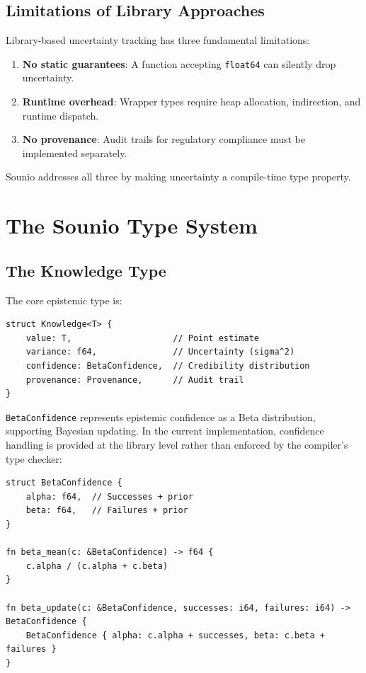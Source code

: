 \documentclass[11pt,a4paper]{article}
\begin{document}
\subsection{Limitations of Library Approaches}

Library-based uncertainty tracking has three fundamental limitations:

\begin{enumerate}
  \item \textbf{No static guarantees}: A function accepting \texttt{float64}
        can silently drop uncertainty.
  \item \textbf{Runtime overhead}: Wrapper types require heap allocation,
        indirection, and runtime dispatch.
  \item \textbf{No provenance}: Audit trails for regulatory compliance must
        be implemented separately.
\end{enumerate}

Sounio addresses all three by making uncertainty a compile-time type property.

\section{The Sounio Type System}
\label{sec:type-system}

\subsection{The Knowledge Type}

The core epistemic type is:

\begin{lstlisting}[caption={Knowledge type definition}]
struct Knowledge<T> {
    value: T,                    // Point estimate
    variance: f64,               // Uncertainty (sigma^2)
    confidence: BetaConfidence,  // Credibility distribution
    provenance: Provenance,      // Audit trail
}
\end{lstlisting}

\texttt{BetaConfidence} represents epistemic confidence as a Beta distribution,
supporting Bayesian updating. In the current implementation, confidence
handling is provided at the library level rather than enforced by the
compiler's type checker:

\begin{lstlisting}[caption={Confidence representation}]
struct BetaConfidence {
    alpha: f64,  // Successes + prior
    beta: f64,   // Failures + prior
}

fn beta_mean(c: &BetaConfidence) -> f64 {
    c.alpha / (c.alpha + c.beta)
}

fn beta_update(c: &BetaConfidence, successes: i64, failures: i64) -> BetaConfidence {
    BetaConfidence { alpha: c.alpha + successes, beta: c.beta + failures }
}
\end{lstlisting}
\end{document}
